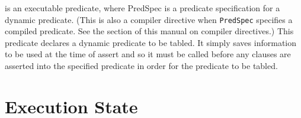 \begin{description}
is an executable predicate, where PredSpec is a predicate
specification for a dynamic predicate. (This is also a compiler
directive when {\tt PredSpec} specifies a compiled predicate. See the
section of this manual on compiler directives.) This predicate
declares a dynamic predicate to be tabled. It simply saves information
to be used at the time of assert and so it must be called before any
clauses are asserted into the specified predicate in order for the
predicate to be tabled.

\end{description}




\section{Execution State}\label{environmental}

